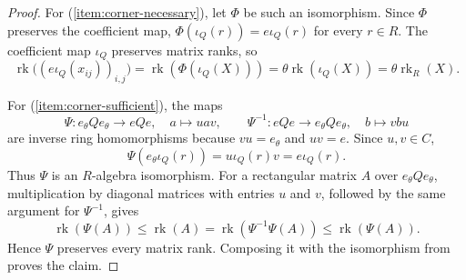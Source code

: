 \documentclass[11pt]{amsart}
\DeclareMathOperator{\rk}{rk}
\theoremstyle{definition}
\theoremstyle{remark}
\begin{document}
\begin{proof}
For (\ref{item:corner-necessary}), let $\Phi$ be such an isomorphism.
Since $\Phi$ preserves the coefficient map,
$\Phi(\iota_Q(r))=e\iota_Q(r)$ for every $r\in R$.
The coefficient map $\iota_Q$ preserves matrix ranks, so
\[
 \rk\bigl((e\iota_Q(x_{ij}))_{i,j}\bigr)
 =\rk(\Phi(\iota_Q(X)))
 =\theta\rk(\iota_Q(X))
 =\theta\rk_R(X).
\]

For (\ref{item:corner-sufficient}), the maps
\[
 \Psi:e_\theta Qe_\theta\longrightarrow eQe,\quad a\longmapsto uav,
 \qquad
 \Psi^{-1}:eQe\longrightarrow e_\theta Qe_\theta,\quad b\longmapsto vbu
\]
are inverse ring homomorphisms because $vu=e_\theta$ and $uv=e$.
Since $u,v\in C$,
\[
 \Psi(e_\theta\iota_Q(r))=u\iota_Q(r)v=e\iota_Q(r).
\]
Thus $\Psi$ is an $R$-algebra isomorphism.
For a rectangular matrix $A$ over $e_\theta Qe_\theta$, multiplication
by diagonal matrices with entries $u$ and $v$, followed by the same
argument for $\Psi^{-1}$, gives
\[
 \rk(\Psi(A))\leq\rk(A)
 =\rk(\Psi^{-1}\Psi(A))\leq\rk(\Psi(A)).
\]
Hence $\Psi$ preserves every matrix rank.  Composing it with the
isomorphism from  proves the claim.
\end{proof}
\end{document}
